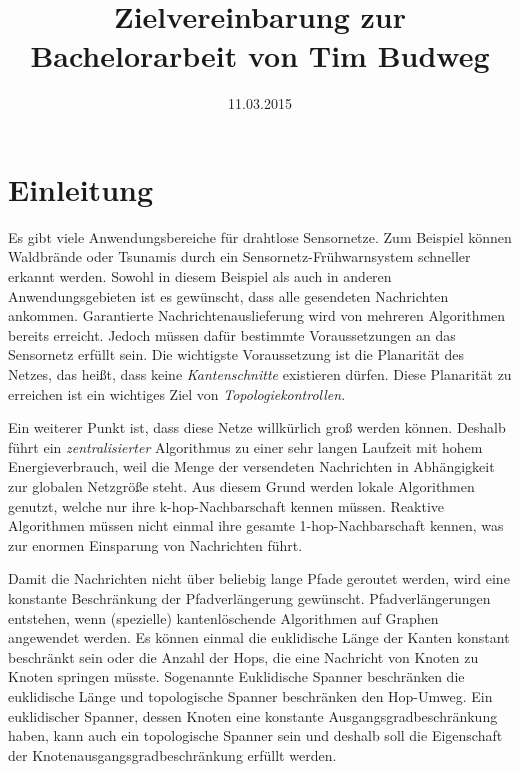 \documentclass[a4paper,DIV10,10pt,headsepline,smallheadings]{scrreprt}
\title{Zielvereinbarung zur Bachelorarbeit von Tim Budweg}
\author{}
\date{11.03.2015}
\begin{document}
\maketitle

\section{Einleitung}
Es gibt viele Anwendungsbereiche für drahtlose Sensornetze. 
Zum Beispiel können Waldbrände oder Tsunamis durch ein Sensornetz-Frühwarnsystem schneller erkannt werden. 
Sowohl in diesem Beispiel als auch in anderen Anwendungsgebieten ist es gewünscht, dass alle gesendeten Nachrichten ankommen.
Garantierte Nachrichtenauslieferung wird von mehreren Algorithmen bereits erreicht.
Jedoch müssen dafür bestimmte Voraussetzungen an das Sensornetz erfüllt sein. 
Die wichtigste Voraussetzung ist die Planarität des Netzes, das heißt, dass keine \emph{Kantenschnitte} existieren dürfen. 
Diese Planarität zu erreichen ist ein wichtiges Ziel von \emph{Topologiekontrollen}.

Ein weiterer Punkt ist, dass diese Netze willkürlich groß werden können.
Deshalb führt ein \emph{zentralisierter} Algorithmus zu einer sehr langen Laufzeit mit hohem Energieverbrauch, weil die Menge der versendeten Nachrichten in Abhängigkeit zur globalen Netzgröße steht.
Aus diesem Grund werden lokale Algorithmen genutzt, welche nur ihre k-hop-Nachbarschaft kennen müssen.
Reaktive Algorithmen müssen nicht einmal ihre gesamte 1-hop-Nachbarschaft kennen, was zur enormen Einsparung von Nachrichten führt.

Damit die Nachrichten nicht über beliebig lange Pfade geroutet werden, wird eine konstante Beschränkung der Pfadverlängerung gewünscht. 
Pfadverlängerungen entstehen, wenn (spezielle) kantenlöschende Algorithmen auf Graphen angewendet werden.
Es können einmal die euklidische Länge der Kanten konstant beschränkt sein oder die Anzahl der Hops, die eine Nachricht von Knoten zu Knoten springen müsste.
Sogenannte Euklidische Spanner beschränken die euklidische Länge und topologische Spanner beschränken den Hop-Umweg.
Ein euklidischer Spanner, dessen Knoten eine konstante Ausgangsgradbeschränkung haben, kann auch ein topologische Spanner sein und deshalb soll die Eigenschaft der Knotenausgangsgradbeschränkung erfüllt werden.
\end{document}
